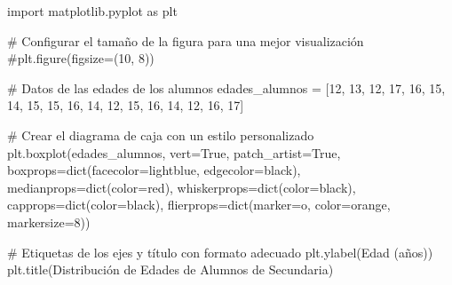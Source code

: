 \documentclass[
  jou,
  floatsintext,
  longtable,
  a4paper,
  nolmodern,
  notxfonts,
  notimes,
  12pt,
  colorlinks=true,linkcolor=blue,citecolor=blue,urlcolor=blue]{apa7}
\newenvironment{Shaded}{\begin{snugshade}}{\end{snugshade}}
\newcommand{\BuiltInTok}[1]{\textcolor[rgb]{0.00,0.23,0.31}{#1}}
\newcommand{\CommentTok}[1]{\textcolor[rgb]{0.37,0.37,0.37}{#1}}
\newcommand{\DecValTok}[1]{\textcolor[rgb]{0.68,0.00,0.00}{#1}}
\newcommand{\ImportTok}[1]{\textcolor[rgb]{0.00,0.46,0.62}{#1}}
\newcommand{\NormalTok}[1]{\textcolor[rgb]{0.00,0.23,0.31}{#1}}
\newcommand{\OperatorTok}[1]{\textcolor[rgb]{0.37,0.37,0.37}{#1}}
\newcommand{\StringTok}[1]{\textcolor[rgb]{0.13,0.47,0.30}{#1}}
\newcommand{\VariableTok}[1]{\textcolor[rgb]{0.07,0.07,0.07}{#1}}
\begin{document}
\begin{Shaded}
\begin{Highlighting}[]
\ImportTok{import}\NormalTok{ matplotlib.pyplot }\ImportTok{as}\NormalTok{ plt}

\CommentTok{\# Configurar el tamaño de la figura para una mejor visualización}
\CommentTok{\#plt.figure(figsize=(10, 8))}

\CommentTok{\# Datos de las edades de los alumnos}
\NormalTok{edades\_alumnos }\OperatorTok{=}\NormalTok{ [}\DecValTok{12}\NormalTok{, }\DecValTok{13}\NormalTok{, }\DecValTok{12}\NormalTok{, }\DecValTok{17}\NormalTok{, }\DecValTok{16}\NormalTok{, }\DecValTok{15}\NormalTok{, }\DecValTok{14}\NormalTok{, }\DecValTok{15}\NormalTok{, }\DecValTok{15}\NormalTok{, }\DecValTok{16}\NormalTok{, }\DecValTok{14}\NormalTok{, }\DecValTok{12}\NormalTok{, }\DecValTok{15}\NormalTok{, }\DecValTok{16}\NormalTok{, }\DecValTok{14}\NormalTok{, }\DecValTok{12}\NormalTok{, }\DecValTok{16}\NormalTok{, }\DecValTok{17}\NormalTok{]}

\CommentTok{\# Crear el diagrama de caja con un estilo personalizado}
\NormalTok{plt.boxplot(edades\_alumnos, vert}\OperatorTok{=}\VariableTok{True}\NormalTok{, patch\_artist}\OperatorTok{=}\VariableTok{True}\NormalTok{, }
\NormalTok{            boxprops}\OperatorTok{=}\BuiltInTok{dict}\NormalTok{(facecolor}\OperatorTok{=}\StringTok{\textquotesingle{}lightblue\textquotesingle{}}\NormalTok{, edgecolor}\OperatorTok{=}\StringTok{\textquotesingle{}black\textquotesingle{}}\NormalTok{),}
\NormalTok{            medianprops}\OperatorTok{=}\BuiltInTok{dict}\NormalTok{(color}\OperatorTok{=}\StringTok{\textquotesingle{}red\textquotesingle{}}\NormalTok{), whiskerprops}\OperatorTok{=}\BuiltInTok{dict}\NormalTok{(color}\OperatorTok{=}\StringTok{\textquotesingle{}black\textquotesingle{}}\NormalTok{),}
\NormalTok{            capprops}\OperatorTok{=}\BuiltInTok{dict}\NormalTok{(color}\OperatorTok{=}\StringTok{\textquotesingle{}black\textquotesingle{}}\NormalTok{), flierprops}\OperatorTok{=}\BuiltInTok{dict}\NormalTok{(marker}\OperatorTok{=}\StringTok{\textquotesingle{}o\textquotesingle{}}\NormalTok{, color}\OperatorTok{=}\StringTok{\textquotesingle{}orange\textquotesingle{}}\NormalTok{, markersize}\OperatorTok{=}\DecValTok{8}\NormalTok{))}

\CommentTok{\# Etiquetas de los ejes y título con formato adecuado}
\NormalTok{plt.ylabel(}\StringTok{\textquotesingle{}Edad (años)\textquotesingle{}}\NormalTok{)}
\NormalTok{plt.title(}\StringTok{\textquotesingle{}Distribución de Edades de Alumnos de Secundaria\textquotesingle{}}\NormalTok{)}


\end{Highlighting}
\end{Shaded}
\end{document}
